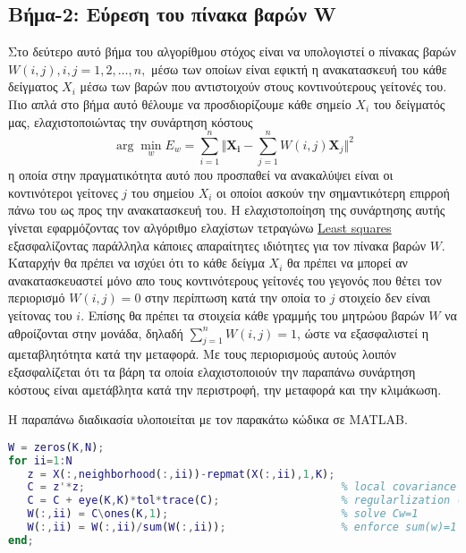 \subsection{Βήμα-2: Εύρεση του πίνακα βαρών \textlatin{W}}
\par
Στο δεύτερο αυτό βήμα του αλγορίθμου στόχος είναι να υπολογιστεί ο πίνακας βαρών $W(i,j),i,j=1,2,\ldots,n,$ μέσω των οποίων είναι εφικτή η ανακατασκευή του κάθε δείγματος $X_{i}$ μέσω των βαρών που αντιστοιχούν στους κοντινούτερους γείτονές του. Πιο απλά στο βήμα αυτό θέλουμε να προσδιορίζουμε κάθε σημείο $X_{i}$ του δείγματός μας, ελαχιστοποιώντας την συνάρτηση κόστους
\newline\hspace*{\fill}
\begin{equation}
        \arg \min_{w} E_{w} = \sum_{i=1}^{n} \Vert \mathbf{X_{i}} - \sum_{j=1}^{n} W(i,j)\mathbf{X}_{j} \Vert ^{2}
\end{equation}
\hspace*{\fill}\newline
η οποία στην πραγματικότητα αυτό που προσπαθεί να ανακαλύψει είναι οι κοντινότεροι γείτονες $j$ του σημείου $X_{i}$ οι οποίοι ασκούν την σημαντικότερη επιρροή πάνω του ως προς την ανακατασκευή του. Η ελαχιστοποίηση της συνάρτησης αυτής γίνεται εφαρμόζοντας τον αλγόριθμο ελαχίστων τετραγώνω \href{https://en.wikipedia.org/wiki/Least_squares}{\textlatin{Least squares}} εξασφαλίζοντας παράλληλα κάποιες απαραίτητες ιδιότητες για τον πίνακα βαρών $W$. Καταρχήν θα πρέπει να ισχύει ότι το κάθε δείγμα $X_{i}$ θα πρέπει να μπορεί αν ανακατασκευαστεί μόνο απο τους κοντινότερους γείτονές του γεγονός που θέτει τον περιορισμό $W(i,j)=0$ στην περίπτωση κατά την οποία το $j$ στοιχείο δεν είναι γείτονας του $i$. Επίσης θα πρέπει τα στοιχεία κάθε γραμμής του μητρώου βαρών $W$ να αθροίζονται στην μονάδα, δηλαδή $\sum_{j=1}^{n} W(i,j)=1$, ώστε να εξασφαλιστεί η αμεταβλητότητα κατά την μεταφορά. Με τους περιορισμούς αυτούς λοιπόν εξασφαλίζεται ότι τα βάρη τα οποία ελαχιστοποιούν την παραπάνω συνάρτηση κόστους είναι αμετάβλητα κατά την περιστροφή, την μεταφορά και την κλιμάκωση.
\par
Η παραπάνω διαδικασία υλοποιείται με τον παρακάτω κώδικα σε 
\textlatin{MATLAB}.
\begin{lstlisting}[language=Matlab]
W = zeros(K,N);
for ii=1:N
   z = X(:,neighborhood(:,ii))-repmat(X(:,ii),1,K); 
   C = z'*z;                                        % local covariance
   C = C + eye(K,K)*tol*trace(C);                   % regularlization (K>D)
   W(:,ii) = C\ones(K,1);                           % solve Cw=1
   W(:,ii) = W(:,ii)/sum(W(:,ii));                  % enforce sum(w)=1
end;
\end{lstlisting}
